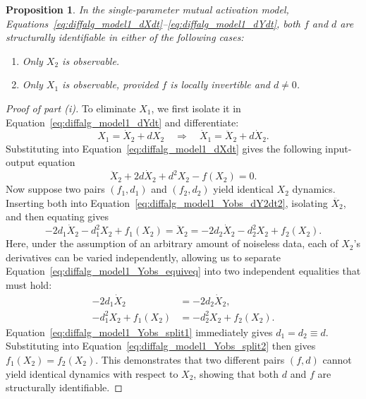 \documentclass[10pt,a4paper]{amsart}
\newtheorem{proposition}{Proposition}
\begin{document}
\begin{proposition} \label{prop:diffalg_one_parameter_identifiability}\label{prop:diffalg_case1}\label{prop:diffalg_case2}
In the single-parameter mutual activation model, Equations~\eqref{eq:diffalg_model1_dXdt}--\eqref{eq:diffalg_model1_dYdt}, both $f$ and $d$ are structurally identifiable in either of the following cases:
\begin{enumerate}
    \item Only $X_2$ is observable.
    \item Only $X_1$ is observable, provided $f$ is locally invertible and $d \neq 0$.
\end{enumerate}
\end{proposition}

\begin{proof}[Proof of part (i)]
To eliminate $X_1$, we first isolate it in Equation~\eqref{eq:diffalg_model1_dYdt} and differentiate:
\begin{equation*}
    X_1= \dot{X}_2 + dX_2 \quad \Longrightarrow \quad \dot{X}_1 = \ddot{X}_2 + d\dot{X}_2.
\end{equation*}
Substituting into Equation~\eqref{eq:diffalg_model1_dXdt} gives the following input-output equation
\begin{equation}
    \label{eq:diffalg_model1_Yobs_dY2dt2}
    \ddot{X}_2 + 2d\dot{X}_2 + d^2 X_2 - f(X_2) = 0.
\end{equation}
Now suppose two pairs $(f_1, d_1)$ and $(f_2, d_2)$ yield identical $X_2$ dynamics. Inserting both into Equation~\eqref{eq:diffalg_model1_Yobs_dY2dt2}, isolating $\ddot{X_2}$, and then equating gives
\begin{equation}
    \label{eq:diffalg_model1_Yobs_equiveq}
    -2d_1\dot{X}_2 - d_1^2 X_2 + f_1(X_2) = \ddot{X}_2 = -2d_2\dot{X}_2 - d_2^2 X_2 + f_2(X_2).
\end{equation}
Here, under the assumption of an arbitrary amount of noiseless data, each of $X_2$'s derivatives can be varied independently, allowing us to separate Equation~\eqref{eq:diffalg_model1_Yobs_equiveq} into two independent equalities that must hold:
\begin{align}
    -2d_1\dot{X}_2       &= -2d_2\dot{X}_2,       \label{eq:diffalg_model1_Yobs_split1} \\
    -d_1^2 X_2 + f_1(X_2) &= -d_2^2 X_2 + f_2(X_2).  \label{eq:diffalg_model1_Yobs_split2}
\end{align}
Equation~\eqref{eq:diffalg_model1_Yobs_split1} immediately gives $d_1 = d_2 \equiv d$. Substituting into Equation~\eqref{eq:diffalg_model1_Yobs_split2} then gives $f_1(X_2) = f_2(X_2)$. This demonstrates that two different pairs $(f, d)$ cannot yield identical dynamics with respect to $X_2$, showing that both $d$ and $f$ are structurally identifiable.
\end{proof}
\end{document}
